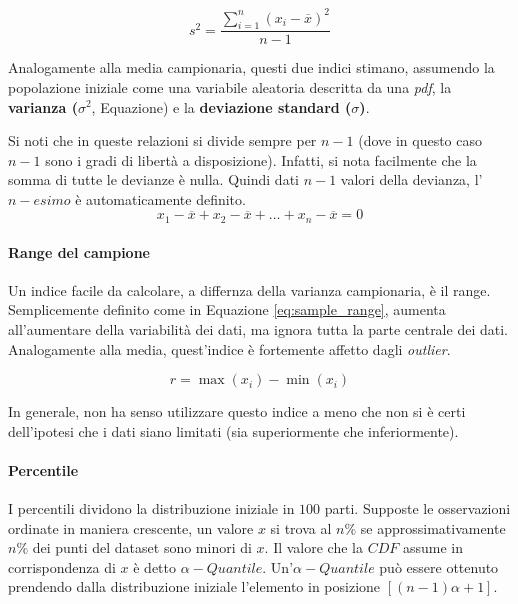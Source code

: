 \documentclass{article}
\begin{document}
\begin{equation}
  s^2 = \displaystyle\frac{\displaystyle\sum_{i=1}^{n}(x_i - \overline{x})^2}{n-1}
  \label{eq:sample_variance}
\end{equation}

Analogamente alla media campionaria, questi due indici stimano, assumendo la popolazione 
iniziale come una variabile aleatoria descritta da una \textit{pdf}, la \textbf{varianza
($\sigma^2$}, Equazione) e la \textbf{deviazione standard ($\sigma$)}.

Si noti che in queste relazioni si divide sempre per $n-1$ (dove in questo caso $n-1$ sono
i gradi di libertà a disposizione). Infatti, si nota facilmente che la somma di tutte 
le devianze è nulla. Quindi dati $n-1$ valori della devianza, l'$n-esimo$ è automaticamente
definito.
\begin{equation*}
  x_1 - \overline{x} + x_2 - \overline{x} + \dots + x_n - \overline{x} = 0
\end{equation*}

\paragraph{Range del campione} Un indice facile da calcolare, a differnza della varianza campionaria, è il range. 
Semplicemente definito come in Equazione \ref{eq:sample_range}, aumenta all'aumentare della 
variabilità dei dati, ma ignora tutta la parte centrale dei dati. Analogamente alla media,
quest'indice è fortemente affetto dagli \textit{outlier}.

\begin{equation}
  r = \max(x_i) - \min(x_i)
  \label{eq:sample_range}
\end{equation}

In generale, non ha senso utilizzare questo indice a meno che non si è certi dell'ipotesi 
che i dati siano limitati (sia superiormente che inferiormente). 

\paragraph{Percentile}
I percentili dividono la distribuzione iniziale in $100$ parti. Supposte le osservazioni 
ordinate in maniera crescente, un valore $x$ si trova al $n\%$ se approssimativamente 
$n\%$ dei punti del dataset sono minori di $x$. Il valore che la $CDF$ assume in corrispondenza
di $x$ è detto $\alpha-Quantile$. Un'$\alpha-Quantile$ può essere ottenuto prendendo 
dalla distribuzione iniziale l'elemento in posizione $[(n-1)\alpha + 1]$.
\end{document}
